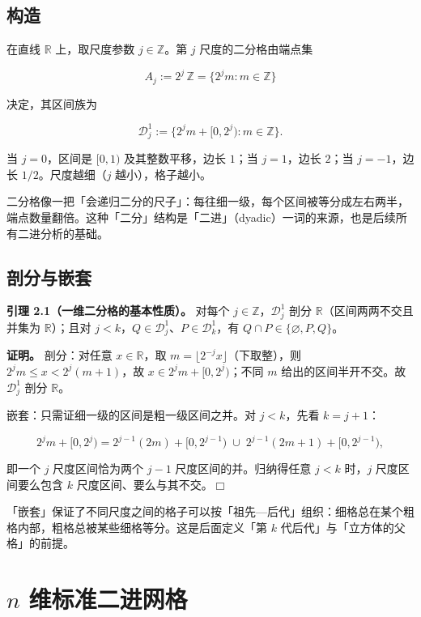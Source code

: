 \documentclass[a4paper,11pt,openany]{ctexbook}
\numberwithin{equation}{chapter}
\numberwithin{figure}{chapter}
\numberwithin{table}{chapter}
\begin{document}
\subsection{构造}

在直线 $\mathbb R$ 上，取尺度参数 $j\in\mathbb Z$。第 $j$ 尺度的二分格由端点集

$$A_j := 2^j\,\mathbb Z = \{2^j m : m\in\mathbb Z\}$$

决定，其区间族为

$$\mathcal D_j^1 := \{2^j m + [0,2^j) : m\in\mathbb Z\}.$$

当 $j=0$，区间是 $[0,1)$ 及其整数平移，边长 $1$；当 $j=1$，边长 $2$；当 $j=-1$，边长 $1/2$。尺度越细（$j$ 越小），格子越小。

\begin{intuitionbox}
二分格像一把「会递归二分的尺子」：每往细一级，每个区间被等分成左右两半，端点数量翻倍。这种「二分」结构是「二进」（dyadic）一词的来源，也是后续所有二进分析的基础。
\end{intuitionbox}

\subsection{剖分与嵌套}

\textbf{引理 2.1（一维二分格的基本性质）。} 对每个 $j\in\mathbb Z$，$\mathcal D_j^1$ 剖分 $\mathbb R$（区间两两不交且并集为 $\mathbb R$）；且对 $j<k$，$Q\in\mathcal D_j^1$、$P\in\mathcal D_k^1$，有 $Q\cap P\in\{\varnothing,P,Q\}$。

\textbf{证明。} 剖分：对任意 $x\in\mathbb R$，取 $m=\lfloor 2^{-j}x\rfloor$（下取整），则 $2^j m\le x<2^j(m+1)$，故 $x\in 2^j m+[0,2^j)$；不同 $m$ 给出的区间半开不交。故 $\mathcal D_j^1$ 剖分 $\mathbb R$。

嵌套：只需证细一级的区间是粗一级区间之并。对 $j<k$，先看 $k=j+1$：

$$2^j m+[0,2^j)=2^{j-1}(2m)+[0,2^{j-1})\;\cup\; 2^{j-1}(2m+1)+[0,2^{j-1}),$$

即一个 $j$ 尺度区间恰为两个 $j-1$ 尺度区间的并。归纳得任意 $j<k$ 时，$j$ 尺度区间要么包含 $k$ 尺度区间、要么与其不交。$\Box$

\begin{intuitionbox}
「嵌套」保证了不同尺度之间的格子可以按「祖先—后代」组织：细格总在某个粗格内部，粗格总被某些细格等分。这是后面定义「第 $k$ 代后代」与「立方体的父格」的前提。
\end{intuitionbox}

\section{$n$ 维标准二进网格}
\end{document}
